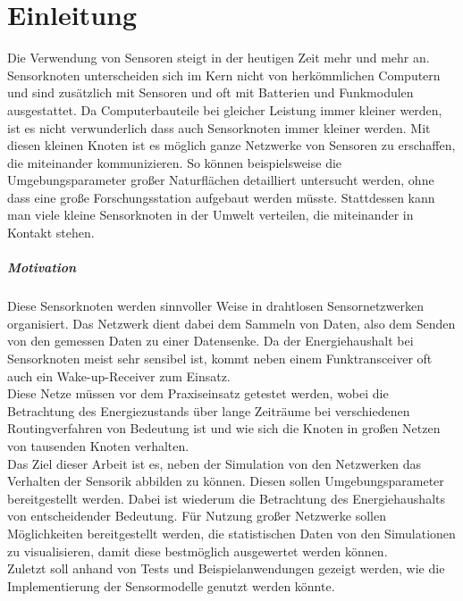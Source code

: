 \chapter{Einleitung}

Die Verwendung von Sensoren steigt in der heutigen Zeit mehr und mehr an. Sensorknoten unterscheiden sich im Kern nicht von herkömmlichen Computern und sind zusätzlich mit Sensoren und oft mit Batterien und Funkmodulen ausgestattet. Da Computerbauteile bei gleicher Leistung immer kleiner werden, ist es nicht verwunderlich dass auch Sensorknoten immer kleiner werden. Mit diesen kleinen Knoten ist es möglich ganze Netzwerke von Sensoren zu erschaffen, die miteinander kommunizieren. So können beispielsweise die Umgebungsparameter großer Naturflächen detailliert untersucht werden, ohne dass eine große Forschungsstation aufgebaut werden müsste. Stattdessen kann man viele kleine Sensorknoten in der Umwelt verteilen, die miteinander in Kontakt stehen.
\paragraph{Motivation}
Diese Sensorknoten werden sinnvoller Weise in drahtlosen Sensornetzwerken organisiert. Das Netzwerk dient dabei dem Sammeln von Daten, also dem Senden von den gemessen Daten zu einer Datensenke. Da der Energiehaushalt bei Sensorknoten meist sehr sensibel ist, kommt neben einem Funktransceiver oft auch ein Wake-up-Receiver zum Einsatz.\\
Diese Netze müssen vor dem Praxiseinsatz getestet werden, wobei die Betrachtung des Energiezustands über lange Zeiträume bei verschiedenen Routingverfahren von Bedeutung ist und wie sich die Knoten in großen Netzen von tausenden Knoten verhalten.\\
Das Ziel dieser Arbeit ist es, neben der Simulation von den Netzwerken das Verhalten der Sensorik abbilden zu können. Diesen sollen Umgebungsparameter bereitgestellt werden. Dabei ist wiederum die Betrachtung des Energiehaushalts von entscheidender Bedeutung. Für Nutzung großer Netzwerke sollen Möglichkeiten bereitgestellt werden, die statistischen Daten von den Simulationen zu visualisieren, damit diese bestmöglich ausgewertet werden können.\\
Zuletzt soll anhand von Tests und Beispielanwendungen gezeigt werden, wie die Implementierung der Sensormodelle genutzt werden könnte.